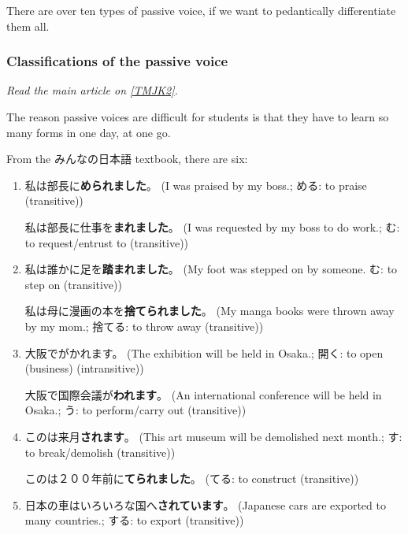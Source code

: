 \documentclass[../nihongo-gakushuu-kyouzai.tex]{subfiles}
\begin{document}
There are over ten types of passive voice, if we want to pedantically differentiate them all.


\subsubsection{Classifications of the passive voice} \label{sec:tmjk-2-classifications-of-passive-voice}
\emph{Read the main article on \href{https://www.tomojuku.com/blog/passive/passive-2/}{[TMJK2]}.}

The reason passive voices are difficult for students is that they have to learn so many forms in one day, at one go.

From the みんなの日本語 textbook, there are six:
\begin{enumerate}[label=\arabic*.]
    \item 私は部長に\textbf{められました}。 (I was praised by my boss.; める: to praise (transitive))

    私は部長に仕事を\textbf{まれました}。 (I was requested by my boss to do work.; む: to request/entrust to (transitive))

    \item 私は誰かに足を\textbf{踏まれました}。 (My foot was stepped on by someone. む: to step on (transitive))

    私は母に漫画の本を\textbf{捨てられました}。 (My manga books were thrown away by my mom.; 捨てる: to throw away (transitive))

    \item 大阪でがかれます。 (The exhibition will be held in Osaka.; 開く: to open (business) (intransitive))

    大阪で国際会議が\textbf{われます}。 (An international conference will be held in Osaka.; う: to perform/carry out (transitive))

    \item このは来月\textbf{されます}。 (This art museum will be demolished next month.; す: to break/demolish (transitive))

    このは２００年前に\textbf{てられました}。 (てる: to construct (transitive))

    \item 日本の車はいろいろな国へ\textbf{されています}。 (Japanese cars are exported to many countries.; する: to export (transitive))


\end{enumerate}
\end{document}
